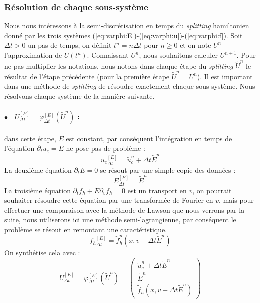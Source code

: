 \subsubsection{Résolution de chaque sous-système}

Nous nous intéressons à la semi-discrétisation en temps du \emph{splitting} hamiltonien donné par les trois systèmes (\ref{eq:varphi:E})-(\ref{eq:varphi:u})-(\ref{eq:varphi:f}). Soit $\Delta t>0$ un pas de temps, on définit $t^n=n\Delta t$ pour $n\geq 0$ et on note $U^n$ l'approximation de $U(t^n)$. Connaissant $U^n$, nous souhaitons calculer $U^{n+1}$. Pour ne pas multiplier les notations, nous notons dans chaque étape du \emph{splitting} $\tilde{U}^n$ le résultat de l'étape précédente (pour la première étape $\tilde{U}^n=U^n$). Il est important dans une méthode de \emph{splitting} de résoudre exactement chaque sous-système. Nous résolvons chaque système de la manière suivante.

\paragraph{$\bullet\quad U^{[E]}_{\Delta t} = \varphi^{[E]}_{\Delta t}(\tilde{U}^n)$ :} dans cette étape, $E$ est constant, par conséquent l'intégration en temps de l'équation $\partial_t u_c = E$ ne pose pas de problème :
$$
  {u_c}^{[E]}_{\Delta t} = \tilde{u}_c^n + \Delta t \tilde{E}^n
$$
La deuxième équation $\partial_t E = 0$ se résout par une simple copie des données :
$$
  E^{[E]}_{\Delta t} = \tilde{E}^n
$$
La troisième équation $\partial_t f_h+E\partial_vf_h=0$ est un transport en $v$, on pourrait souhaiter résoudre cette équation par une transformée de Fourier en $v$, mais pour effectuer une comparaison avec la méthode de Lawson que nous verrons par la suite, nous utiliserons ici une méthode semi-lagrangienne, par conséquent le problème se résout en remontant une caractéristique.
$$
  {f_h}^{[E]}_{\Delta t} = \tilde{f}_h^n(x,v-\Delta t\tilde{E}^n)
$$
On synthétise cela avec :
$$
  U^{[E]}_{\Delta t} = \varphi^{[E]}_{\Delta t}(\tilde{U}^n)
  = \begin{pmatrix}
      \tilde{u}_c^n + \Delta t \tilde{E}^n \\
      \tilde{E}^n \\
      \tilde{f}_h (x,v-\Delta t \tilde{E}^n)
    \end{pmatrix}
$$

